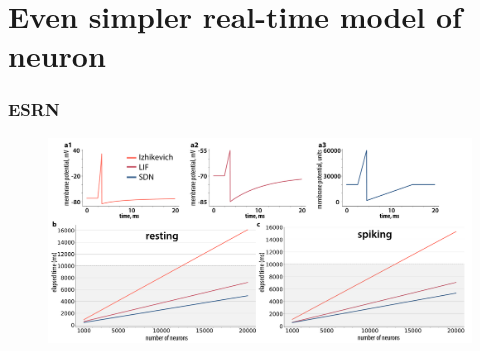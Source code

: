 \documentclass[12pt, aspectratio=169]{beamer}
\begin{document}

\section{Even simpler real-time model of neuron}
\begin{frame}
  \frametitle{ESRN}
  \begin{figure}
    \includegraphics[width=0.8\linewidth]{states}
  \end{figure}
\end{frame}

\end{document}
